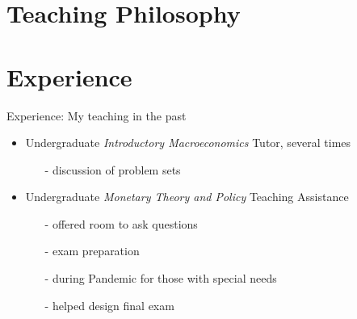 

\section*{Teaching Philosophy}

\section*{Experience}
\begin{frame}{Experience: My teaching in the past}
	\begin{itemize}
		\item Undergraduate \textit{Introductory  Macroeconomics} Tutor, several times
		\vspace{2mm}
		\begin{itemize}
			\item[-] discussion of problem sets
		\end{itemize}
	\vspace{3mm}
		\item Undergraduate \textit{Monetary Theory and Policy} Teaching Assistance
		\vspace{2mm}		
		\begin{itemize}
			\item[-] offered room to ask questions
			\item[-] exam preparation 
			\item[-] during Pandemic for those with special needs
			\item[-] helped design final exam
		\end{itemize}
	\end{itemize}
\end{frame}

